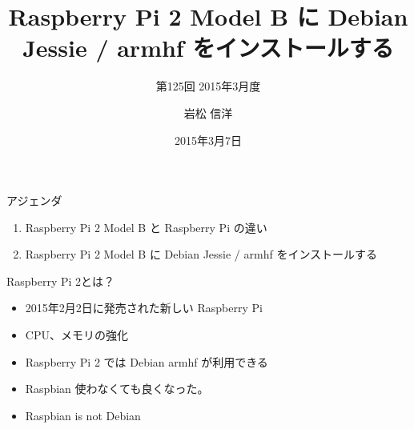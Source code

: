 \title{Raspberry Pi 2 Model B に Debian Jessie / armhf をインストールする}
\subtitle{第125回 2015年3月度}
\author{岩松 信洋}
\date{2015年3月7日}



\begin{frame}
\titlepage{}
\end{frame}

\begin{frame}{アジェンダ}
\begin{enumerate}
\item Raspberry Pi 2 Model B と Raspberry Pi の違い
\item Raspberry Pi 2 Model B に Debian Jessie / armhf をインストールする
\end{enumerate}
\end{frame}




\begin{frame}{Raspberry Pi 2とは？}
\begin{itemize}
\item 2015年2月2日に発売された新しい Raspberry Pi
\item CPU、メモリの強化
\item Raspberry Pi 2 では Debian armhf が利用できる
\item Raspbian 使わなくても良くなった。
\item Raspbian is not Debian
\end{itemize}
\end{frame}

